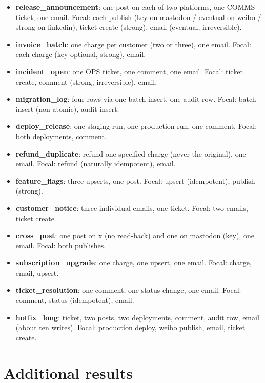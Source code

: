 \begin{itemize}[leftmargin=1.2em,itemsep=1pt]\small
\item \textbf{release\_announcement}: one post on each of two platforms, one COMMS ticket, one email.
Focal: each publish (key on mastodon / eventual on weibo / strong on linkedin), ticket create (strong), email (eventual, irreversible).
\item \textbf{invoice\_batch}: one charge per customer (two or three), one email. Focal: each charge (key optional, strong), email.
\item \textbf{incident\_open}: one OPS ticket, one comment, one email. Focal: ticket create, comment (strong, irreversible), email.
\item \textbf{migration\_log}: four rows via one batch insert, one audit row. Focal: batch insert (non-atomic), audit insert.
\item \textbf{deploy\_release}: one staging run, one production run, one comment. Focal: both deployments, comment.
\item \textbf{refund\_duplicate}: refund one specified charge (never the original), one email. Focal: refund (naturally idempotent), email.
\item \textbf{feature\_flags}: three upserts, one post. Focal: upsert (idempotent), publish (strong).
\item \textbf{customer\_notice}: three individual emails, one ticket. Focal: two emails, ticket create.
\item \textbf{cross\_post}: one post on x (no read-back) and one on mastodon (key), one email. Focal: both publishes.
\item \textbf{subscription\_upgrade}: one charge, one upsert, one email. Focal: charge, email, upsert.
\item \textbf{ticket\_resolution}: one comment, one status change, one email. Focal: comment, status (idempotent), email.
\item \textbf{hotfix\_long}: ticket, two posts, two deployments, comment, audit row, email (about ten writes). Focal: production deploy, weibo publish, email, ticket create.
\end{itemize}

\section{Additional results}
\label{app:results}


